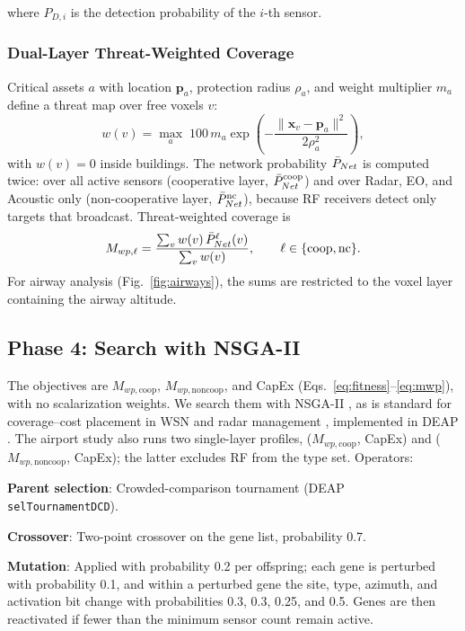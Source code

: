 where $P_{D,i}$ is the detection probability of the $i$-th sensor.

\subsubsection{Dual-Layer Threat-Weighted Coverage}
\label{sec:dual_metrics}

Critical assets \(a\) with location \(\mathbf{p}_a\), protection radius \(\rho_a\), and weight multiplier \(m_a\) define a threat map over free voxels \(v\):
\begin{equation}
w(v) = \max_a\; 100\, m_a \exp\!\left(-\frac{\lVert \mathbf{x}_v - \mathbf{p}_a \rVert^2}{2\rho_a^2}\right),
\label{eq:threat}
\end{equation}
with \(w(v)=0\) inside buildings. The network probability \(\bar{P}_{Net}\) is computed twice: over all active sensors (cooperative layer, \(\bar{P}_{Net}^{\mathrm{coop}}\)) and over Radar, EO, and Acoustic only (non-cooperative layer, \(\bar{P}_{Net}^{\mathrm{nc}}\)), because RF receivers detect only targets that broadcast. Threat-weighted coverage is
\begin{equation}
M_{wp,\ell} = \frac{\sum_v w(v)\,\bar{P}_{Net}^{\ell}(v)}{\sum_v w(v)}, \qquad \ell\in\{\mathrm{coop},\mathrm{nc}\}.
\label{eq:mwp}
\end{equation}
For airway analysis (Fig.~\ref{fig:airways}), the sums are restricted to the voxel layer containing the airway altitude.

\subsection{Phase 4: Search with NSGA-II}

The objectives are \(M_{wp,\mathrm{coop}}\), \(M_{wp,\mathrm{noncoop}}\), and CapEx (Eqs.~\eqref{eq:fitness}--\eqref{eq:mwp}), with no scalarization weights. We search them with NSGA-II \cite{deb2002fast}, as is standard for coverage--cost placement in WSN and radar management \cite{molina2008layout,iqbal2015wsn,charlish2016radar}, implemented in DEAP \cite{deap2012}. The airport study also runs two single-layer profiles, (\(M_{wp,\mathrm{coop}}\), CapEx) and (\(M_{wp,\mathrm{noncoop}}\), CapEx); the latter excludes RF from the type set. Operators:

\textbf{Parent selection}: Crowded-comparison tournament (DEAP \texttt{selTournamentDCD}).

\textbf{Crossover}: Two-point crossover on the gene list, probability 0.7.

\textbf{Mutation}: Applied with probability 0.2 per offspring; each gene is perturbed with probability 0.1, and within a perturbed gene the site, type, azimuth, and activation bit change with probabilities 0.3, 0.3, 0.25, and 0.5. Genes are then reactivated if fewer than the minimum sensor count remain active.

